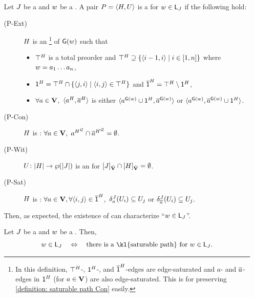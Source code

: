 \begin{definition}\label{definition: saturable path}
    Let $\graph[3]$ be a  and $\word$ be a .
    A pair $P = \tuple{\graph[2], U}$ is a \intro*{} for $\word \in \const{L}_{\graph[3]}$ if the following hold:
    \begin{description}
        \item[(P-Ext)\label{definition: saturable path Ext}] $\graph[2]$ is an \footnote{In this definition, $\top^{\graph[2]}$-, $\id^{\graph[2]}$-, and $\com{\id}^{\graph[2]}$-edges are edge-saturated
        and $a$- and $\overline{a}$-edges in $\id^{\graph[2]}$ (for $a \in \mathbf{V}$) are also edge-saturated.
        This is for preserving \ref{definition: saturable path Con} easily.} of $\const{\graph}(\word)$ such that
        \begin{itemize}
                \item $\top^{\graph[2]}$ is a total preorder and $\top^{\graph[2]} \supseteq \set{\tuple{i-1, i} \mid i \in \range{1, n}}$ where $\word = a_1 \dots a_n$,
                \item $\id^{\graph[2]} = \top^{\graph[2]} \cap \set{\tuple{j, i} \mid \tuple{i, j} \in \top^{\graph[2]}}$ and $\com{\id}^{\graph[2]} = \top^{\graph[2]} \setminus \id^{\graph[2]}$,
                \item $\forall a \in \mathbf{V}$,\  $\tuple{a^{\graph[2]}, \com{a}^{\graph[2]}}$ is either $\tuple{a^{\const{\graph}(\word)} \cup \id^{\graph[2]}, \com{a}^{\const{\graph}(\word)}}$ or $\tuple{a^{\const{\graph}(\word)}, \com{a}^{\const{\graph}(\word)} \cup \id^{\graph[2]}}$.
            \end{itemize}
        \item[(P-Con)\label{definition: saturable path Con}]  $\graph[2]$ is \intro*{}:
        $\forall a \in \vsig,\  a^{\graph[2]^{\FillQ}} \cap \com{a}^{\graph[2]^{\FillQ}} = \emptyset$.
        \item[(P-Wit)\label{definition: saturable path Wit}] $U \colon \domain{\graph[2]} \to \wp(\domain{\graph[3]})$ is an  for $\ljump{\graph[3]}_{\tilde{\vsig}} \cap \ljump{\graph[2]}_{\tilde{\vsig}} = \emptyset$.
        \item[(P-Sat)\label{definition: saturable path Sat}]  $\graph[2]$ is \intro*{}:
        $\forall a \in \vsig, \forall \tuple{i, j} \in \com{\id}^{\graph[2]}$,\  $\delta_{a}^{\graph[3]}(U_i) \subseteq U_j$ or $\delta_{\com{a}}^{\graph[3]}(U_i) \subseteq U_j$. \lipicsEnd
    \end{description}
\end{definition}
Then, as expected, the existence of  can characterize ``$\word \in \const{L}_{\graph[3]}$''.
\begin{lemma}\label{lemma: saturable path}
    Let $\graph[3]$ be a  and $\word$ be a .
    Then,
    \[\word \in \const{L}_{\graph[3]} \quad\Leftrightarrow\quad \mbox{there is a \kl{saturable path} for $\word \in \const{L}_{\graph[3]}$.}\]
\end{lemma}

